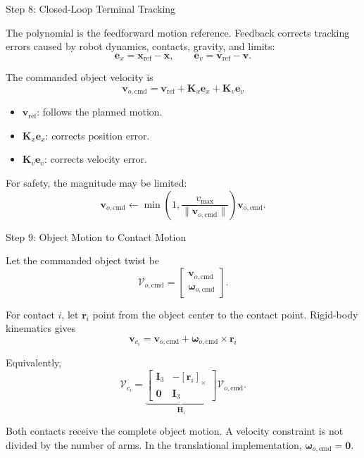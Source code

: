 \documentclass[aspectratio=169]{beamer}
\newcommand{\vect}[1]{\bm{#1}}
\begin{document}
\begin{frame}{Step 8: Closed-Loop Terminal Tracking}

The polynomial is the feedforward motion reference. Feedback corrects
tracking errors caused by robot dynamics, contacts, gravity, and limits:
\[
\vect{e}_x=\vect{x}_{\mathrm{ref}}-\vect{x},
\qquad
\vect{e}_v=\vect{v}_{\mathrm{ref}}-\vect{v}.
\]

The commanded object velocity is
\[
\boxed{
\vect{v}_{o,\mathrm{cmd}}
=\vect{v}_{\mathrm{ref}}
+\vect{K}_x\vect{e}_x
+\vect{K}_v\vect{e}_v
}
\]

\begin{itemize}
    \item $\vect{v}_{\mathrm{ref}}$: follows the planned motion.
    \item $\vect{K}_x\vect{e}_x$: corrects position error.
    \item $\vect{K}_v\vect{e}_v$: corrects velocity error.
\end{itemize}

For safety, the magnitude may be limited:
\[
\vect{v}_{o,\mathrm{cmd}}
\leftarrow
\min\!\left(1,\frac{v_{\max}}{\|\vect{v}_{o,\mathrm{cmd}}\|}\right)
\vect{v}_{o,\mathrm{cmd}}.
\]

\end{frame}

\begin{frame}{Step 9: Object Motion to Contact Motion}

Let the commanded object twist be
\[
\vect{\mathcal{V}}_{o,\mathrm{cmd}}
=\begin{bmatrix}\vect{v}_{o,\mathrm{cmd}}\\\vect{\omega}_{o,\mathrm{cmd}}\end{bmatrix}.
\]

For contact $i$, let $\vect{r}_i$ point from the object center to the
contact point. Rigid-body kinematics gives
\[
\boxed{
\vect{v}_{c_i}
=\vect{v}_{o,\mathrm{cmd}}
+\vect{\omega}_{o,\mathrm{cmd}}\times\vect{r}_i
}
\]

Equivalently,
\[
\vect{\mathcal{V}}_{c_i}
=\underbrace{
\begin{bmatrix}
\vect{I}_3&-[\vect{r}_i]_{\times}\\
\vect{0}&\vect{I}_3
\end{bmatrix}}_{\vect{H}_i}
\vect{\mathcal{V}}_{o,\mathrm{cmd}}.
\]

Both contacts receive the complete object motion. A velocity constraint is
not divided by the number of arms. In the translational implementation,
$\vect{\omega}_{o,\mathrm{cmd}}=\vect{0}$.

\end{frame}
\end{document}

